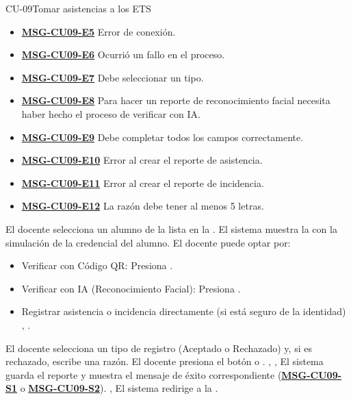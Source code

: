 \begin{UseCase}{CU-09}{Tomar asistencias a los ETS}
{\begin{itemize}
			\item \textbf{\hyperref[msg:CU09-E5]{MSG-CU09-E5}} Error de conexión.
			\item \textbf{\hyperref[msg:CU09-E6]{MSG-CU09-E6}} Ocurrió un fallo en el proceso.
			\item \textbf{\hyperref[msg:CU09-E7]{MSG-CU09-E7}} Debe seleccionar un tipo.
			\item \textbf{\hyperref[msg:CU09-E8]{MSG-CU09-E8}} Para hacer un reporte de reconocimiento facial necesita haber hecho el proceso de verificar con IA.
			\item \textbf{\hyperref[msg:CU09-E9]{MSG-CU09-E9}} Debe completar todos los campos correctamente.
			\item \textbf{\hyperref[msg:CU09-E10]{MSG-CU09-E10}} Error al crear el reporte de asistencia.
			\item \textbf{\hyperref[msg:CU09-E11]{MSG-CU09-E11}} Error al crear el reporte de incidencia.
			\item \textbf{\hyperref[msg:CU09-E12]{MSG-CU09-E12}} La razón debe tener al menos 5 letras.
		\end{itemize}
	}
\end{UseCase}
\begin{UCtrayectoria}
	\UCpaso[\UCactor] El docente selecciona un alumno de la lista en la .
	\UCpaso El sistema muestra la  con la simulación de la credencial del alumno. 
	\UCpaso[\UCactor] El docente puede optar por:
	\begin{itemize}
		\item Verificar con Código QR: Presiona  .
		\item Verificar con IA (Reconocimiento Facial): Presiona  .
		\item Registrar asistencia o incidencia directamente (si está seguro de la identidad) , .
	\end{itemize}
	\UCpaso[\UCactor] El docente selecciona un tipo de registro (Aceptado o Rechazado) y, si es rechazado, escribe una razón. 
	\UCpaso[\UCactor] El docente presiona el botón  o . , , 
	\UCpaso El sistema guarda el reporte y muestra el mensaje de éxito correspondiente (\textbf{\hyperref[msg:CU09-S1]{MSG-CU09-S1}} o \textbf{\hyperref[msg:CU09-S2]{MSG-CU09-S2}}). , 
	\UCpaso El sistema redirige a la .
\end{UCtrayectoria}

